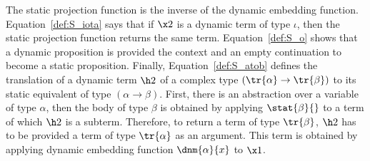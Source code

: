 The static projection function is the inverse of the dynamic embedding function. Equation~\eqref{def:S_iota} says that if $\x2$ is a dynamic term of type $ \iota$, then the static projection function returns the same term. Equation~\eqref{def:S_o} shows that a dynamic proposition is provided the context and an empty continuation to become a static proposition. Finally, Equation~\eqref{def:S_atob} defines the translation of a dynamic term $\h2$ of a complex type $(\tr{\alpha} \rightarrow \tr{\beta})$ to its static equivalent of type $(\alpha \rightarrow \beta)$. First, there is an abstraction over a variable of type $\alpha$, then the body of type $\beta$ is obtained by applying $\stat{\beta}{}$ to a term of which $\h2$ is a subterm. Therefore, to return a term of type $\tr{\beta}$, $\h2$ has to be provided a term of type $\tr{\alpha}$ as an argument. This term is obtained by applying dynamic embedding function $\dnm{\alpha}{x}$ to $ \x1$.


